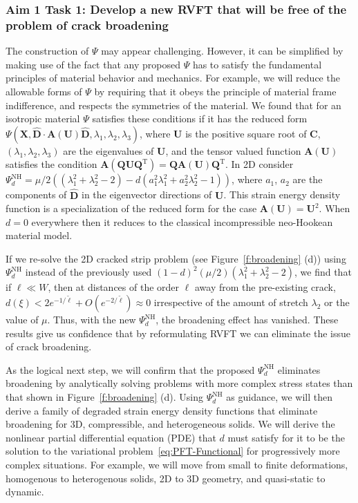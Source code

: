 \documentclass[10pt,letterpaper]{article}
\newcommand{\bs}[1]{\ensuremath{\boldsymbol{#1}}}
\begin{document}
   \subsubsection{Aim 1 Task 1: Develop a  new RVFT that will be free of the problem of crack broadening}
    The construction of $\mathsf{\Psi}$ may appear challenging.  However, it can be simplified by making use of the fact that any proposed $\mathsf{\Psi}$ has to satisfy the fundamental principles of material behavior and mechanics.  For example, we will reduce the allowable forms of $\mathsf{\Psi}$ by requiring that it obeys the principle of material frame indifference, and respects the symmetries of the material. We found that for an isotropic material ${\mathsf{\Psi}}$ satisfies these conditions if it has the reduced form ${\mathsf{\Psi}}(\bs{X}, \hat{\bs{D}}\cdot\mathbf{A}(\bs{U})\hat{\bs{D}}, \lambda_1, \lambda_2,\lambda_3)$, where $\bs{U}$ is the positive square root of $\bs{C}$, $(\lambda_1,\lambda_2,\lambda_3)$ are the eigenvalues of $\bs{U}$, and the tensor valued function $\bs{A}(\bs{U})$ satisfies the condition $\bs{A}(\bs{Q}\bs{U}\bs{Q}^{\text{T}})=\bs{Q}\bs{A}(\bs{U})\bs{Q}^{\text{T}}$.  In 2D consider $\mathsf{\Psi}_d^{\text{NH}}=\mu/2((\lambda_1^2+\lambda_2^2-2)-d( a_1^2\lambda_1^2+a_2^2\lambda_2^2-1))$, where $a_1$, $a_2$ are the components of $\hat{\bs{D}}$ in the eigenvector directions of $\bs{U}$.  This strain energy density function is a specialization of the reduced form for the case $\bs{A}(\bs{U})=\bs{U}^2$. When $d=0$ everywhere then it reduces to the classical incompressible neo-Hookean material model.


    If we re-solve the 2D cracked strip problem (see Figure~\ref{f:broadening} (d)) using $\mathsf{\Psi}_d^{\text{NH}}$ instead of the previously used $(1-d)^2 (\mu/2)(\lambda_1^2+\lambda_2^2-2)$, we find that if $\ell \ll W$, then at distances of the order $\ell$ away from the pre-existing crack, $d(\xi)<  2e^{-1/\tilde{\ell}}+O(e^{-2/\tilde{\ell}})\approx 0$ irrespective of the amount of stretch $\lambda_2$ or the value of $\mu$. Thus, with the new $\mathsf{\Psi}_d^{\text{NH}}$, the broadening effect has vanished. These results give us confidence that by reformulating RVFT we can eliminate the issue of crack broadening.

    As the logical next step, we will confirm that the proposed $\mathsf{\Psi}_d^{\text{NH}}$ eliminates broadening by analytically solving problems with more complex stress states than that shown in Figure~\ref{f:broadening} (d). Using $\mathsf{\Psi}_d^{\text{NH}}$ as guidance,  we will then derive a family of degraded strain energy density functions that eliminate broadening for 3D, compressible, and heterogeneous solids. We will derive the nonlinear partial differential equation (PDE) that $d$ must satisfy for it to be the solution to the variational problem~\eqref{eq:PFT-Functional} for progressively more complex situations. For example, we will move from small  to finite deformations, homogenous to heterogenous solids, 2D to 3D geometry, and quasi-static to dynamic.
\end{document}

